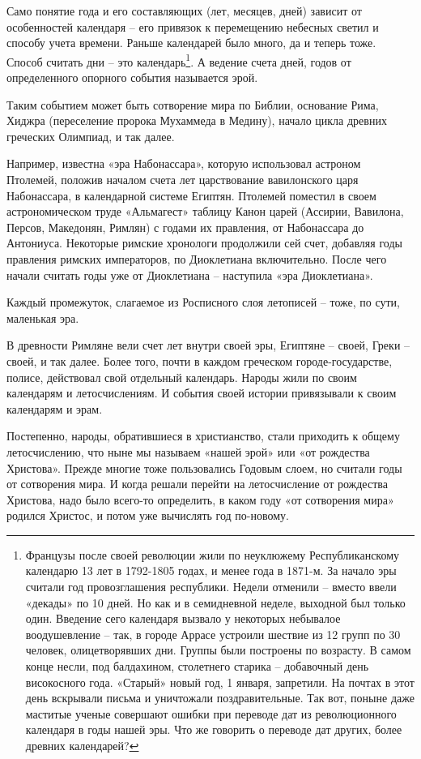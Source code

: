 Само понятие года и его составляющих (лет, месяцев, дней) зависит от особенностей календаря – его привязок к перемещению небесных светил и способу учета времени. Раньше календарей было много, да и теперь тоже. Способ считать дни – это календарь\footnote{Французы после своей революции жили по неуклюжему Республиканскому календарю 13 лет в 1792-1805 годах, и менее года в 1871-м. За начало эры считали год провозглашения республики. Недели отменили – вместо ввели «декады» по 10 дней. Но как и в семидневной неделе, выходной был только один. Введение сего календаря вызвало у некоторых небывалое воодушевление – так, в городе Аррасе устроили шествие из 12 групп по 30 человек, олицетворявших дни. Группы были построены по возрасту. В самом конце несли, под балдахином, столетнего старика – добавочный день високосного года. «Старый» новый год, 1 января, запретили. На почтах в этот день вскрывали письма и уничтожали поздравительные. Так вот, поныне даже маститые ученые совершают ошибки при переводе дат из революционного календаря в годы нашей эры. Что же говорить о переводе дат других, более древних календарей?}. А ведение счета дней, годов от определенного опорного события называется эрой.

Таким событием может быть сотворение мира по Библии, основание Рима, Хиджра (переселение пророка Мухаммеда в Медину), начало цикла древних греческих Олимпиад, и так далее.

Например, известна «эра Набонассара», которую использовал астроном Птолемей, положив началом счета лет царствование вавилонского царя Набонассара, в календарной системе Египтян. Птолемей поместил в своем астрономическом труде «Альмагест» таблицу Канон царей (Ассирии, Вавилона, Персов, Македонян, Римлян) с годами их правления, от Набонассара до Антониуса. Некоторые римские хронологи продолжили сей счет, добавляя годы правления римских императоров, по Диоклетиана включительно. После чего начали считать годы уже от Диоклетиана – наступила «эра Диоклетиана».

Каждый промежуток, слагаемое из Росписного слоя летописей – тоже, по сути, маленькая эра. 

В древности Римляне вели счет лет внутри своей эры, Египтяне – своей, Греки – своей, и так далее. Более того, почти в каждом греческом городе-государстве, полисе, действовал свой отдельный календарь. Народы жили по своим календарям и летосчислениям. И события своей истории привязывали к своим календарям и эрам.

Постепенно, народы, обратившиеся в христианство, стали приходить к общему летосчислению, что ныне мы называем «нашей эрой» или «от рождества Христова». Прежде многие тоже пользовались Годовым слоем, но считали годы от сотворения мира. И когда решали перейти на летосчисление от рождества Христова, надо было всего-то определить, в каком году «от сотворения мира» родился Христос, и потом уже вычислять год по-новому.

